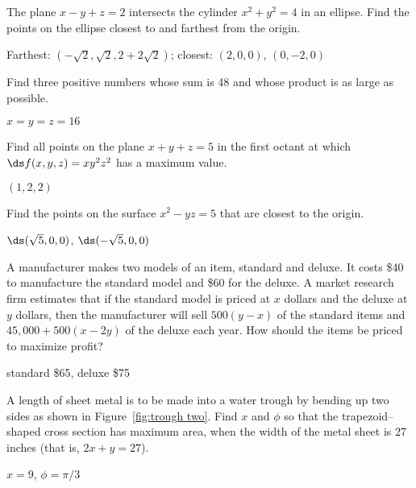 \begin{enumialphparenastyle}
\begin{ex}
The plane $x-y+z=2$ intersects the cylinder $x^2+y^2=4$ in an
ellipse. Find the points on the ellipse closest to and farthest from
the origin.
\begin{sol}
Farthest: $(-\sqrt2,\sqrt2,2+2\sqrt2)$; closest:
$(2,0,0)$, $(0,-2,0)$
\end{sol}
\end{ex}

\begin{ex}
Find three positive numbers whose sum is 48 and whose
product is as large as possible.
\begin{sol}
$x=y=z=16$
\end{sol}
\end{ex}

\begin{ex}
Find all points on the plane $x+y+z = 5$ in the first octant at
which $\ds f(x,y,z) = xy^2z^2$ has a maximum value.
\begin{sol}
$(1,2,2)$
\end{sol}
\end{ex}

\begin{ex}
Find the points on the surface $x^2 -yz = 5$ that are closest to the
origin.
\begin{sol}
$\ds (\sqrt{5},0,0)$, $\ds (-\sqrt{5},0,0)$
\end{sol}
\end{ex}

\begin{ex}
A manufacturer makes two models of an item, standard and deluxe.  It
costs \$40 to manufacture the standard model and \$60 for the deluxe.  A
market research firm estimates that if the standard model is priced at $x$
dollars and the deluxe at $y$ dollars, then the manufacturer will sell
$500(y-x)$ of the standard items and $45,000+500(x-2y)$ of the deluxe each
year.  How should the items be priced to maximize profit?
\begin{sol}
standard \$65, deluxe \$75
\end{sol}
\end{ex}

\begin{ex}
A length of sheet metal is to be made into a
water trough by bending up two sides as shown in
Figure~\ref{fig:trough two}.  Find $x$ and $\phi$ so that the
trapezoid--shaped cross section has maximum area, when
the width of the metal sheet is 27 inches (that is, $2x+y=27$).
\begin{sol}
$x=9$, $\phi=\pi/3$
\end{sol}


\end{ex}
\end{enumialphparenastyle}
